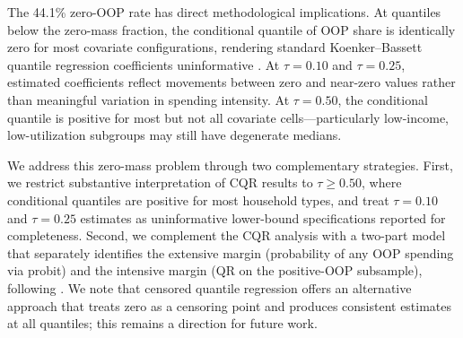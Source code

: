 The 44.1\% zero-OOP rate has direct methodological implications. At quantiles below the zero-mass fraction, the conditional quantile of OOP share is identically zero for most covariate configurations, rendering standard Koenker--Bassett quantile regression coefficients uninformative \citep{MachadoSilva2005}. At $\tau = 0.10$ and $\tau = 0.25$, estimated coefficients reflect movements between zero and near-zero values rather than meaningful variation in spending intensity. At $\tau = 0.50$, the conditional quantile is positive for most but not all covariate cells---particularly low-income, low-utilization subgroups may still have degenerate medians.

We address this zero-mass problem through two complementary strategies. First, we restrict substantive interpretation of CQR results to $\tau \geq 0.50$, where conditional quantiles are positive for most household types, and treat $\tau = 0.10$ and $\tau = 0.25$ estimates as uninformative lower-bound specifications reported for completeness. Second, we complement the CQR analysis with a two-part model that separately identifies the extensive margin (probability of any OOP spending via probit) and the intensive margin (QR on the positive-OOP subsample), following \citet{Manning1987}. We note that censored quantile regression \citep{Powell1986, Chernozhukov2002} offers an alternative approach that treats zero as a censoring point and produces consistent estimates at all quantiles; this remains a direction for future work.
